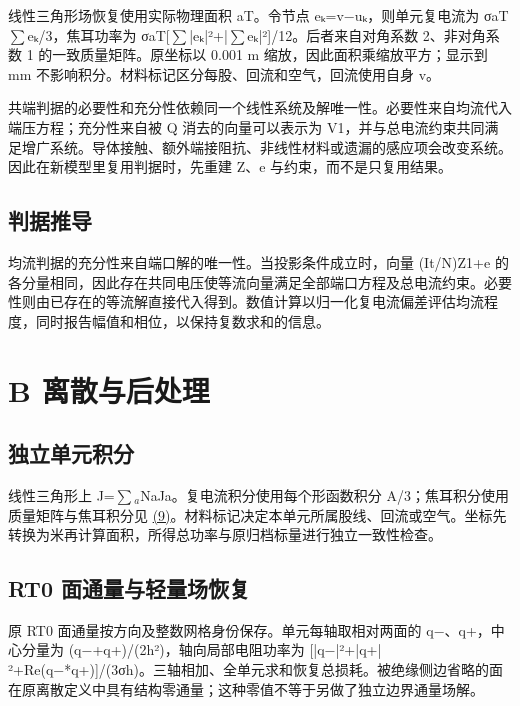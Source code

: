 \documentclass[journal,10pt]{IEEEtran}
\begin{document}
线性三角形场恢复使用实际物理面积 aT。令节点 eₖ=v−uₖ，则单元复电流为 σaT\(\sum\)eₖ/3，焦耳功率为 σaT[\(\sum\)|eₖ|²+|\(\sum\)eₖ|²]/12。后者来自对角系数 2、非对角系数 1 的一致质量矩阵。原坐标以 0.001 m 缩放，因此面积乘缩放平方；显示到 mm 不影响积分。材料标记区分每股、回流和空气，回流使用自身 v。


共端判据的必要性和充分性依赖同一个线性系统及解唯一性。必要性来自均流代入端压方程；充分性来自被 Q 消去的向量可以表示为 V1，并与总电流约束共同满足增广系统。导体接触、额外端接阻抗、非线性材料或遗漏的感应项会改变系统。因此在新模型里复用判据时，先重建 Z、e 与约束，而不是只复用结果。


\subsection*{判据推导}
\hypertarget{A.sharing_derivation.heading}{}
均流判据的充分性来自端口解的唯一性。当投影条件成立时，向量 (It/N)Z1+e 的各分量相同，因此存在共同电压使等流向量满足全部端口方程及总电流约束。必要性则由已存在的等流解直接代入得到。数值计算以归一化复电流偏差评估均流程度，同时报告幅值和相位，以保持复数求和的信息。


\FloatBarrier
\section*{B 离散与后处理}
\hypertarget{chapter-B}{}
\subsection*{独立单元积分}
\hypertarget{B.triangle_derivation.heading}{}
线性三角形上 J=\(\sum\)\(_a\)NaJa。复电流积分使用每个形函数积分 A/3；焦耳积分使用质量矩阵与焦耳积分见 \href{report_zh-CN_ieee.pdf#E09}{(9)}。材料标记决定本单元所属股线、回流或空气。坐标先转换为米再计算面积，所得总功率与原归档标量进行独立一致性检查。


\subsection*{RT0 面通量与轻量场恢复}
\hypertarget{B.report_rt0.heading}{}
原 RT0 面通量按方向及整数网格身份保存。单元每轴取相对两面的 q−、q+，中心分量为 (q−+q+)/(2h²)，轴向局部电阻功率为 [|q−|²+|q+|²+Re(q−*q+)]/(3σh)。三轴相加、全单元求和恢复总损耗。被绝缘侧边省略的面在原离散定义中具有结构零通量；这种零值不等于另做了独立边界通量场解。
\end{document}
